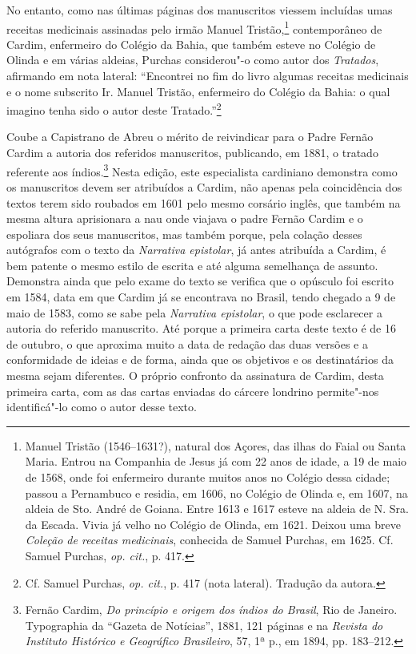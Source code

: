 No entanto, como nas últimas páginas dos manuscritos viessem
incluídas umas receitas medicinais assinadas pelo irmão Manuel
Tristão,\footnote{ Manuel Tristão (1546--1631?), natural dos Açores,
das ilhas do Faial ou Santa Maria. Entrou na Companhia de Jesus já com
22 anos de idade, a 19 de maio de 1568, onde foi enfermeiro durante
muitos anos no Colégio dessa cidade; passou a Pernambuco e residia, em
1606, no Colégio de Olinda e, em 1607, na aldeia de Sto. André de
Goiana. Entre 1613 e 1617 esteve na aldeia de N. Sra. da Escada. Vivia já
velho no Colégio de Olinda, em 1621. Deixou uma breve 
\textit{Coleção de receitas medicinais}, conhecida de Samuel Purchas, em 1625. Cf.
Samuel Purchas, \textit{op. cit.}, p. 417.} contemporâneo de Cardim,
enfermeiro do Colégio da Bahia, que também esteve no Colégio de Olinda
e em várias aldeias, Purchas considerou"-o como autor dos
\textit{Tratados}, afirmando em nota lateral: ``Encontrei 
no fim do livro algumas receitas medicinais e o nome subscrito
Ir. Manuel Tristão, enfermeiro do Colégio da Bahia: o qual imagino
tenha sido o autor deste Tratado.''\footnote{ Cf. Samuel
Purchas, \textit{op. cit.}, p. 417 (nota lateral). Tradução da autora.}

Coube a Capistrano de Abreu o mérito de reivindicar para o
Padre Fernão Cardim a autoria dos referidos manuscritos, publicando, em
1881, o tratado referente aos índios.\footnote{ Fernão Cardim,
\textit{Do princípio e origem dos índios do Brasil}, Rio de Janeiro.
Typographia da ``Gazeta de Notícias'', 1881, 121 páginas e na
\textit{Revista do Instituto Histórico e Geográfico Brasileiro}, 57,
1ª p., em 1894, pp. 183--212.} Nesta edição, este especialista cardiniano
demonstra como os manuscritos devem ser atribuídos a Cardim, não apenas
pela coincidência dos textos terem sido roubados em 1601 pelo mesmo
corsário inglês, que também na mesma altura aprisionara a nau onde
viajava o padre Fernão Cardim e o espoliara dos seus manuscritos, mas
também porque, pela colação desses autógrafos com o texto da
\textit{Narrativa epistolar}, já antes atribuída a Cardim, é bem
patente o mesmo estilo de escrita e até alguma semelhança de assunto.
Demonstra ainda que pelo exame do texto se verifica que o opúsculo
foi escrito em 1584, data em que Cardim já se encontrava no Brasil,
tendo chegado a 9 de maio de 1583, como se sabe pela \textit{Narrativa epistolar}, 
o que pode esclarecer a autoria do referido manuscrito. Até
porque a primeira carta deste texto é de 16 de outubro, o que aproxima
muito a data de redação das duas versões e a conformidade de ideias e
de forma, ainda que os objetivos e os destinatários da mesma sejam diferentes.
O próprio confronto da assinatura de Cardim, desta primeira carta, com as das 
cartas enviadas do cárcere londrino permite"-nos identificá"-lo como o autor desse texto.   

